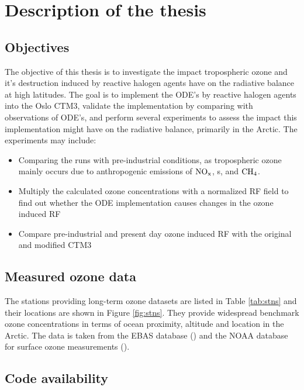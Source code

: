 \section{Description of the thesis}

\subsection{Objectives}

The objective of this thesis is to investigate the impact tropospheric ozone and it's destruction induced by reactive halogen agents have on the radiative balance at high latitudes. The goal is to implement the ODE's by reactive halogen agents into the Oslo CTM3, validate the implementation by comparing with observations of ODE's, and perform several experiments to assess the  impact this implementation might have on the radiative balance, primarily in the Arctic. The experiments may include: 

\begin{itemize}
    \item Comparing the runs with pre-industrial conditions, as tropospheric ozone mainly occurs due to anthropogenic emissions of $\mathrm{NO_x}$, s,  and $\mathrm{CH_4}$.
    \item Multiply the calculated ozone concentrations with a normalized RF field to find out whether the ODE implementation causes changes in the ozone induced RF
    \item Compare pre-industrial and present day ozone induced RF with the original and modified CTM3
\end{itemize}

\subsection{Measured ozone data}

The stations providing long-term ozone datasets are listed in Table \ref{tab:stns} and their locations are shown in Figure \ref{fig:stns}. They provide widespread benchmark ozone concentrations in terms of ocean proximity, altitude and location in the Arctic. The data is taken from the EBAS database (\cite{EBAS}) and the NOAA database for surface ozone measurements (\cite{NOAA}).




\subsection{Code availability}

